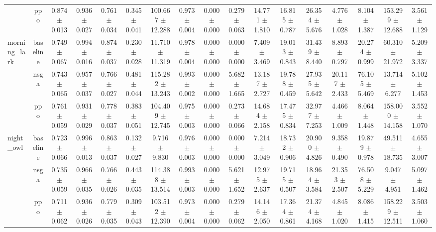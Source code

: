 \begin{table}[htbp]
\begin{tabular}{|l|c|c|c|c|c|c|c|c|c|c|c|c|c|c|c|c|}
 & ppo & 0.874 $\pm$ 0.013 & 0.936 $\pm$ 0.027 & 0.761 $\pm$ 0.034 & 0.345 $\pm$ 0.041 & 100.667 $\pm$ 12.288 & 0.973 $\pm$ 0.004 & 0.000 $\pm$ 0.000 & 0.279 $\pm$ 0.063 & 14.771 $\pm$ 1.810 & 16.815 $\pm$ 0.787 & 26.354 $\pm$ 5.676 & 4.776 $\pm$ 1.028 & 8.104 $\pm$ 1.387 & 153.299 $\pm$ 12.688 & 3.561 $\pm$ 1.129 \\
\cline{1-17}
\multirow[t]{3}{*}{morning_lark} & baseline & 0.749 $\pm$ 0.067 & 0.994 $\pm$ 0.016 & 0.874 $\pm$ 0.037 & 0.230 $\pm$ 0.028 & 11.710 $\pm$ 11.319 & 0.978 $\pm$ 0.004 & 0.000 $\pm$ 0.000 & 0.000 $\pm$ 0.000 & 7.409 $\pm$ 3.469 & 19.013 $\pm$ 0.843 & 31.439 $\pm$ 8.440 & 8.893 $\pm$ 0.797 & 20.274 $\pm$ 0.999 & 60.310 $\pm$ 21.972 & 5.209 $\pm$ 3.337 \\
 & nsga & 0.743 $\pm$ 0.065 & 0.957 $\pm$ 0.037 & 0.766 $\pm$ 0.027 & 0.481 $\pm$ 0.044 & 115.282 $\pm$ 13.243 & 0.993 $\pm$ 0.002 & 0.000 $\pm$ 0.000 & 5.682 $\pm$ 1.665 & 13.187 $\pm$ 2.727 & 19.788 $\pm$ 0.459 & 27.935 $\pm$ 5.642 & 20.117 $\pm$ 2.433 & 76.105 $\pm$ 5.469 & 13.714 $\pm$ 6.277 & 5.102 $\pm$ 1.453 \\
 & ppo & 0.761 $\pm$ 0.059 & 0.931 $\pm$ 0.029 & 0.778 $\pm$ 0.037 & 0.383 $\pm$ 0.051 & 104.409 $\pm$ 12.745 & 0.975 $\pm$ 0.003 & 0.000 $\pm$ 0.000 & 0.273 $\pm$ 0.066 & 14.684 $\pm$ 2.158 & 17.475 $\pm$ 0.834 & 32.977 $\pm$ 7.253 & 4.466 $\pm$ 1.009 & 8.064 $\pm$ 1.448 & 158.000 $\pm$ 14.158 & 3.552 $\pm$ 1.070 \\
\cline{1-17}
\multirow[t]{3}{*}{night_owl} & baseline & 0.723 $\pm$ 0.066 & 0.996 $\pm$ 0.013 & 0.863 $\pm$ 0.037 & 0.132 $\pm$ 0.027 & 9.716 $\pm$ 9.830 & 0.976 $\pm$ 0.003 & 0.000 $\pm$ 0.000 & 0.000 $\pm$ 0.000 & 7.214 $\pm$ 3.049 & 18.732 $\pm$ 0.906 & 20.900 $\pm$ 4.826 & 9.358 $\pm$ 0.490 & 19.879 $\pm$ 0.978 & 49.511 $\pm$ 18.735 & 4.655 $\pm$ 3.007 \\
 & nsga & 0.735 $\pm$ 0.059 & 0.966 $\pm$ 0.035 & 0.766 $\pm$ 0.026 & 0.443 $\pm$ 0.035 & 114.388 $\pm$ 13.514 & 0.993 $\pm$ 0.003 & 0.000 $\pm$ 0.000 & 5.621 $\pm$ 1.652 & 12.975 $\pm$ 2.637 & 19.715 $\pm$ 0.507 & 18.964 $\pm$ 3.584 & 21.353 $\pm$ 2.507 & 76.508 $\pm$ 5.229 & 9.047 $\pm$ 4.951 & 5.097 $\pm$ 1.462 \\
 & ppo & 0.711 $\pm$ 0.062 & 0.936 $\pm$ 0.026 & 0.779 $\pm$ 0.035 & 0.309 $\pm$ 0.043 & 103.512 $\pm$ 12.390 & 0.973 $\pm$ 0.004 & 0.000 $\pm$ 0.000 & 0.279 $\pm$ 0.062 & 14.146 $\pm$ 2.050 & 17.364 $\pm$ 0.861 & 21.374 $\pm$ 4.168 & 4.845 $\pm$ 1.020 & 8.086 $\pm$ 1.415 & 158.229 $\pm$ 12.511 & 3.503 $\pm$ 1.060 \\
\cline{1-17}
\bottomrule
\end{tabular}
\end{table}


